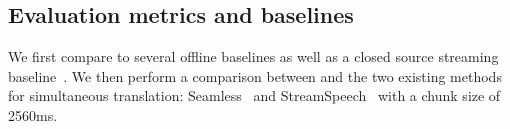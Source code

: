 \begin{table*}[t]
\caption{Objective comparison of Hibiki with StreamSpeech~\citep{streamspeech} and Seamless~\citep{seamless}.}
\label{tab:streaming_big_table}
\vskip 0.15in
\begin{center}
\begin{sc}
\end{sc}
\end{center}
\vskip -0.1in
\end{table*}

\subsection{Evaluation metrics and baselines}
\label{sec:eval-metrics}

We first compare \ours to several offline baselines as well as a closed source streaming baseline~\cite{rnn-t-s2st}.
We then perform a comparison between \ours and the two existing methods for simultaneous translation: Seamless~\cite{seamless} and StreamSpeech~\cite{streamspeech} with a chunk size of 2560ms.

